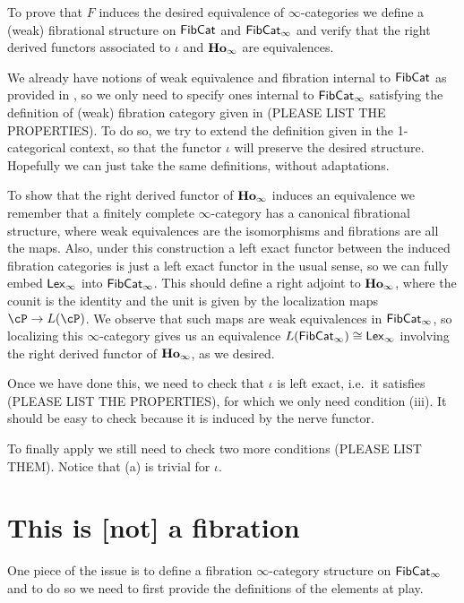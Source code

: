 \documentclass[a4paper,12pt,openany]{scrartcl}
\begin{document}
To prove that $F$ induces the desired equivalence of $\infty$-categories we
define a (weak) fibrational structure on $\operatorname{\mathsf{FibCat}}$ and $\operatorname{\mathsf{FibCat}}_\infty$ and
verify that the right derived functors associated to $\iota$ and
$\operatorname{\mathbf{Ho}_\infty}$ are equivalences.

We already have notions of weak equivalence and fibration
internal to $\operatorname{\mathsf{FibCat}}$ as provided in \cite{KS19}, so we only need to specify
ones internal to $\operatorname{\mathsf{FibCat}}_\infty$ satisfying the definition of (weak)
fibration category given in \cite[Def.\ 7.4.12]{Cis19} (PLEASE LIST THE
PROPERTIES). To do so, we try to extend the definition given in the
1-categorical context, so that the functor $\iota$ will preserve the desired
structure. Hopefully we can just take the same definitions, without adaptations.

To show that the right derived functor of $\operatorname{\mathbf{Ho}_\infty}$ induces an equivalence we
remember that a finitely
complete $\infty$-category has a canonical fibrational structure, where weak
equivalences are the isomorphisms and fibrations are all the maps. Also, under
this construction a left exact functor between the induced fibration categories
is just a left exact functor in the usual sense, so we can fully embed
$\operatorname{\mathsf{Lex}_\infty}$ into $\operatorname{\mathsf{FibCat}}_\infty$. This should define a right adjoint to
$\operatorname{\mathbf{Ho}_\infty}$, where the counit is the identity and the unit is given by the
localization maps $\cP\rightarrow L(\cP)$. We observe that such maps are weak
equivalences in $\operatorname{\mathsf{FibCat}}_\infty$, so localizing this $\infty$-category gives us
an equivalence $L(\operatorname{\mathsf{FibCat}}_\infty)\cong\operatorname{\mathsf{Lex}_\infty}$ involving the right derived
functor of $\operatorname{\mathbf{Ho}_\infty}$, as we desired.

Once we have done this, we need to check that $\iota$ is left exact, i.e.\ it
satisfies \cite[Def.\ 7.5.2]{Cis19} (PLEASE LIST THE PROPERTIES), for which we
only need condition (iii). It should be easy to check because it is induced by
the nerve functor.

To finally apply \cite[Thm.\ 7.6.15]{Cis19} we still need to check two more
conditions (PLEASE LIST THEM). Notice that (a) is trivial for $\iota$.

\section{This is [not] a fibration}

One piece of the issue is to define a fibration $\infty$-category structure on
$\operatorname{\mathsf{FibCat}}_\infty$ and to do so we need to first provide the definitions of the
elements at play.
\end{document}
